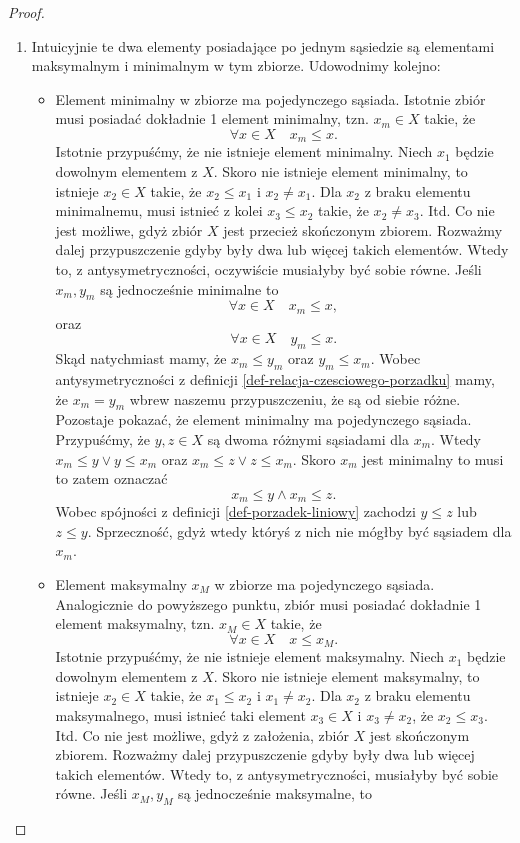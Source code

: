 \documentclass[12pt,a4paper]{report}
\begin{document}
\begin{proof}
\begin{enumerate}
\item Intuicyjnie te dwa elementy posiadające po jednym sąsiedzie są elementami maksymalnym i minimalnym w tym zbiorze. Udowodnimy kolejno:
\begin{itemize}
\item Element minimalny w zbiorze ma pojedynczego sąsiada. Istotnie zbiór musi posiadać dokładnie 1 element minimalny, tzn. $x_m \in X$ takie, że 
$$
\forall x \in X \quad x_m \leq x.
$$
Istotnie przypuśćmy, że nie istnieje element minimalny. Niech $x_1$ będzie dowolnym elementem z $X$. Skoro nie istnieje element minimalny, to istnieje $x_2 \in X$ takie, że $x_2 \leq x_1$ i $x_2 \neq x_1$. Dla $x_2$ z braku elementu minimalnemu, musi istnieć z kolei $x_3 \leq x_2$ takie, że $x_2 \neq x_3$. Itd. Co nie jest możliwe, gdyż zbiór $X$ jest przecież skończonym zbiorem.
Rozważmy dalej przypuszczenie gdyby były dwa lub więcej takich elementów. Wtedy to, z antysymetryczności, oczywiście musiałyby być sobie równe. Jeśli $x_m, y_m$ są jednocześnie minimalne to
$$
\forall x \in X \quad x_m \leq x,
$$
oraz 
$$
\forall x \in X \quad y_m \leq x.
$$
Skąd natychmiast mamy, że $ x_m \leq y_m$ oraz $y_m \leq x_m$. Wobec antysymetryczności z definicji \ref{def-relacja-czesciowego-porzadku} mamy, że $x_m = y_m$ wbrew naszemu przypuszczeniu, że są od siebie różne.
Pozostaje pokazać, że element minimalny ma pojedynczego sąsiada. Przypuśćmy, że $y,z \in X$ są dwoma różnymi sąsiadami dla $x_m$. Wtedy $ x_m \leq y \lor y \leq x_m$ oraz $ x_m \leq z \lor z \leq x_m$. Skoro $x_m$ jest minimalny to musi to zatem oznaczać
$$
x_m \leq y \land x_m \leq z.
$$ 
Wobec spójności z definicji \ref{def-porzadek-liniowy} zachodzi $y \leq z$ lub $z \leq y$. Sprzeczność, gdyż wtedy któryś z nich nie mógłby być sąsiadem dla $x_m$.
\item Element maksymalny $x_M$ w zbiorze ma pojedynczego sąsiada. Analogicznie do powyższego punktu, zbiór musi posiadać dokładnie 1 element maksymalny, tzn. $x_M \in X$ takie, że
$$\forall x \in X \quad x \leq x_M.$$
Istotnie przypuśćmy, że nie istnieje element maksymalny. Niech $x_1$ będzie dowolnym elementem z $X$. Skoro nie istnieje element maksymalny, to istnieje $x_2 \in X$ takie, że $x_1 \leq x_2$ i $x_1 \neq x_2$. Dla $x_2$ z braku elementu maksymalnego, musi istnieć taki element $x_3 \in X$ i $x_3 \neq x_2$, że $x_2 \leq x_3$. Itd. Co nie jest możliwe, gdyż z założenia, zbiór $X$ jest skończonym zbiorem.
Rozważmy dalej przypuszczenie gdyby były dwa lub więcej takich elementów. Wtedy to, z antysymetryczności, musiałyby być sobie równe. Jeśli $x_M, y_M$ są jednocześnie maksymalne, to 

\end{itemize}
\end{enumerate}
\end{proof}
\end{document}
